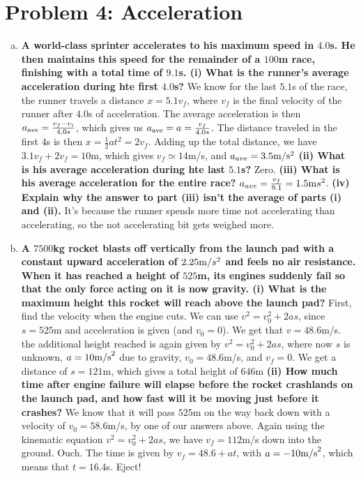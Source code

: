 \documentclass[10pt,letter]{article}
\begin{document}
\section*{Problem 4: Acceleration}
\begin{enumerate}[(a)]
\item {\bf A world-class sprinter accelerates to his maximum speed in $4.0$s. He then maintains this speed for the remainder of a $100$m race, finishing with a total time of $9.1$s. (i) What is the runner's average acceleration during hte first $4.0$s?}
We know for the last $5.1$s of the race, the runner travels a distance $x = 5.1 v_f$, where $v_f$ is the final velocity of the runner after $4.0$s of acceleration. The average acceleration is then $a_{\rm ave} = \frac{v_f - v_i}{4.0s}$, which gives us $a_{\rm ave} = a = \frac{v_f}{4.0s}$. The distance traveled in the first $4$s is then $x = \frac{1}{2} a t^2 = 2v_f$. Adding up the total distance, we have $3.1 v_f + 2 v_f = 10$m, which gives $v_f \simeq 14$m/s, and $a_{ave} = 3.5 {\rm m}/{\rm s}^2$ {\bf (ii) What is his average acceleration during hte last $5.1$s?} Zero. {\bf (iii) What is his average acceleration for the entire race?} $a_{ave} = \frac{v_f}{9.1} = 1.5 {\rm m}{s^2}$. {\bf (iv) Explain why the answer to part (iii) isn't the average of parts (i) and (ii).} It's because the runner spends more time not accelerating than accelerating, so the not accelerating bit gets weighed more.
\item {\bf A $7500$kg rocket blasts off vertically from the launch pad with a constant upward acceleration of $2.25 {\rm m}/{s^2}$ and feels no air resistance. When it has reached a height of $525$m, its engines suddenly fail so that the only force acting on it is now gravity. (i) What is the maximum height this rocket will reach above the launch pad?}
First, find the velocity when the engine cuts. We can use $v^2 = v_0^2 + 2as$, since $s = 525$m and acceleration is given (and $v_0 = 0$). We get that $v = 48.6$m/s. the additional height reached is again given by $v^2 = v_0^2 + 2as$, where now $s$ is unknown, $a = 10{\rm m/s}^2$ due to gravity, $v_0 = 48.6$m/s, and $v_f = 0$. We get a distance of $s = 121$m, which gives a total height of $646$m
 {\bf (ii) How much time after engine failure will elapse before the rocket crashlands on the launch pad, and how fast will it be moving just before it crashes?}
 We know that it will pass $525$m on the way back down with a velocity of $v_0 = 58.6$m/s, by one of our answers above. Again using the kinematic equation $v^2 = v_0^2 + 2as$, we have $v_f = 112$m/s down into the ground. Ouch. The time is given by $v_f = 48.6 + at$, with $a = -10 {\rm m/s}^2$, which means that $t = 16.4$s. Eject! 
\end{enumerate}
\end{document}
